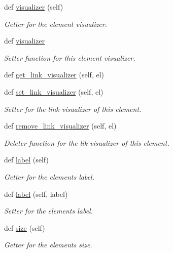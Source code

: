 \begin{DoxyCompactItemize}
def \hyperlink{classbridges_1_1element_1_1_element_a727ec3cb97aeb68fec4cb456535f6763}{visualizer} (self)
\begin{DoxyCompactList}\small\item\em Getter for the element visualizer. \end{DoxyCompactList}\item 
def \hyperlink{classbridges_1_1element_1_1_element_a38aad89ce4b1e01cb9f548cac4313077}{visualizer}
\begin{DoxyCompactList}\small\item\em Setter function for this element visualizer. \end{DoxyCompactList}\item 
def \hyperlink{classbridges_1_1element_1_1_element_af04537af8ad9f64047de96a524c8c1f9}{get\+\_\+link\+\_\+visualizer} (self, el)
\item 
def \hyperlink{classbridges_1_1element_1_1_element_afe94604116e0dec9a60a4ea54a462323}{set\+\_\+link\+\_\+visualizer} (self, el)
\begin{DoxyCompactList}\small\item\em Setter for the link visualizer of this element. \end{DoxyCompactList}\item 
def \hyperlink{classbridges_1_1element_1_1_element_ad2aff75ace2a306deff639b4aa129ce0}{remove\+\_\+link\+\_\+visualizer} (self, el)
\begin{DoxyCompactList}\small\item\em Deleter function for the lik visualizer of this element. \end{DoxyCompactList}\item 
def \hyperlink{classbridges_1_1element_1_1_element_a3cd2f535bb7993254b8d255cb0166062}{label} (self)
\begin{DoxyCompactList}\small\item\em Getter for the element\textquotesingle{}s label. \end{DoxyCompactList}\item 
def \hyperlink{classbridges_1_1element_1_1_element_a29dd33558e94464186658d2baad1d6c9}{label} (self, label)
\begin{DoxyCompactList}\small\item\em Setter for the element\textquotesingle{}s label. \end{DoxyCompactList}\item 
def \hyperlink{classbridges_1_1element_1_1_element_a4d25b09a11a282c8c8147b16cd45c5bf}{size} (self)
\begin{DoxyCompactList}\small\item\em Getter for the element\textquotesingle{}s size. \end{DoxyCompactList}\item 

\end{DoxyCompactItemize}
